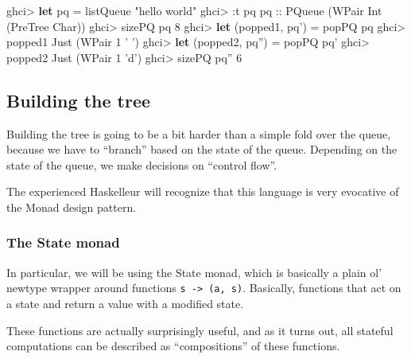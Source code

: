 \documentclass[]{article}
\newenvironment{Shaded}{}{}
\newcommand{\KeywordTok}[1]{\textcolor[rgb]{0.00,0.44,0.13}{\textbf{{#1}}}}
\newcommand{\DataTypeTok}[1]{\textcolor[rgb]{0.56,0.13,0.00}{{#1}}}
\newcommand{\DecValTok}[1]{\textcolor[rgb]{0.25,0.63,0.44}{{#1}}}
\newcommand{\CharTok}[1]{\textcolor[rgb]{0.25,0.44,0.63}{{#1}}}
\newcommand{\StringTok}[1]{\textcolor[rgb]{0.25,0.44,0.63}{{#1}}}
\newcommand{\OtherTok}[1]{\textcolor[rgb]{0.00,0.44,0.13}{{#1}}}
\newcommand{\FunctionTok}[1]{\textcolor[rgb]{0.02,0.16,0.49}{{#1}}}
\newcommand{\NormalTok}[1]{{#1}}
\begin{document}
\begin{Shaded}
\begin{Highlighting}[]
\NormalTok{ghci}\FunctionTok{>} \KeywordTok{let} \NormalTok{pq }\FunctionTok{=} \NormalTok{listQueue }\StringTok{"hello world"}
\NormalTok{ghci}\FunctionTok{>} \FunctionTok{:}\NormalTok{t pq}
\OtherTok{pq ::} \DataTypeTok{PQueue} \NormalTok{(}\DataTypeTok{WPair} \DataTypeTok{Int} \NormalTok{(}\DataTypeTok{PreTree} \DataTypeTok{Char}\NormalTok{))}
\NormalTok{ghci}\FunctionTok{>} \NormalTok{sizePQ pq}
\DecValTok{8}
\NormalTok{ghci}\FunctionTok{>} \KeywordTok{let} \NormalTok{(popped1, pq') }\FunctionTok{=} \NormalTok{popPQ pq}
\NormalTok{ghci}\FunctionTok{>} \NormalTok{popped1}
\DataTypeTok{Just} \NormalTok{(}\DataTypeTok{WPair} \DecValTok{1} \CharTok{' '}\NormalTok{)}
\NormalTok{ghci}\FunctionTok{>} \KeywordTok{let} \NormalTok{(popped2, pq'') }\FunctionTok{=} \NormalTok{popPQ pq'}
\NormalTok{ghci}\FunctionTok{>} \NormalTok{popped2}
\DataTypeTok{Just} \NormalTok{(}\DataTypeTok{WPair} \DecValTok{1} \CharTok{'d'}\NormalTok{)}
\NormalTok{ghci}\FunctionTok{>} \NormalTok{sizePQ pq''}
\DecValTok{6}
\end{Highlighting}
\end{Shaded}

\subsection{Building the tree}\label{building-the-tree}

Building the tree is going to be a bit harder than a simple fold over
the queue, because we have to ``branch'' based on the state of the
queue. Depending on the state of the queue, we make decisions on
``control flow''.

The experienced Haskelleur will recognize that this language is very
evocative of the Monad design pattern.

\subsubsection{The State monad}\label{the-state-monad}

In particular, we will be using the State monad, which is basically a
plain ol' newtype wrapper around functions
\texttt{s\ -\textgreater{}\ (a,\ s)}. Basically, functions that act on a
state and return a value with a modified state.

These functions are actually surprisingly useful, and as it turns out,
all stateful computations can be described as ``compositions'' of these
functions.
\end{document}
